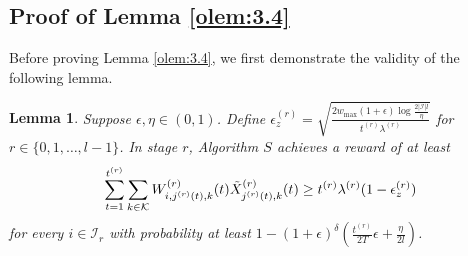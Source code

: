 \documentclass[letterpaper, 10 pt, conference]{ieeeconf}  %
\newcommand{\III}{\mathcal{I}}
\newcommand{\KKK}{\mathcal{K}}
\theoremstyle{plain}
\newtheorem{lemma}{Lemma}
\theoremstyle{definition}
\theoremstyle{remark}
\begin{document}
\subsection{Proof of Lemma \ref{olem:3.4}}
Before proving Lemma \ref{olem:3.4}, we first demonstrate the validity of the following lemma.
\begin{lemma}\label{olem:A.2}
Suppose $\epsilon, \eta \in (0, 1)$. Define $\epsilon^{(r)}_{z}=\sqrt{\frac{2w_{\max} (1+\epsilon) \log\frac{2|\III|l}{\eta}}{t^{(r)} \lambda^{(r)}}}$ for $r \in \{0,1,\ldots,l-1\}$. In stage $r$, Algorithm $S$ achieves a reward of at least $$\sum^{t^{(r)}}_{t=1} \sum_{k \in \KKK} W^{(r)}_{i,j^{(r)}(t),k}(t) \Tilde{X}^{(r)}_{j^{(r)}(t),k}(t) \geq t^{(r)} \lambda^{(r)} (1-\epsilon^{(r)}_{z})$$ for every $i\in \III_r$ with probability at least $1- \left(1+\epsilon\right)^{\delta} (\frac{t^{(r)}}{2T} \epsilon + \frac{\eta}{2l})$. 
\end{lemma}
\end{document}
